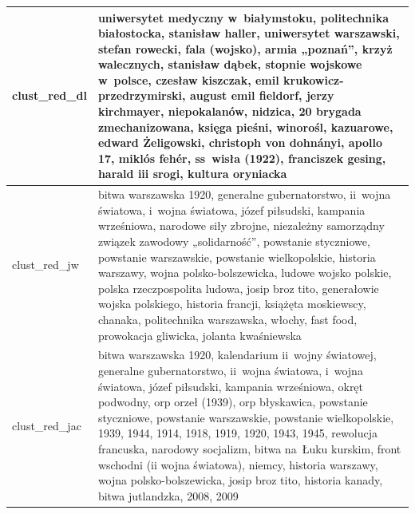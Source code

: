 \documentclass{praca1}
\begin{document}
\begin{longtable}{|L{0.5cm}|L{15cm}|}
   \hline
\begin{sideways}clust\_red\_dl\end{sideways} & uniwersytet medyczny w~białymstoku, politechnika białostocka, stanisław haller, uniwersytet warszawski, stefan rowecki, fala (wojsko), armia „poznań”, krzyż walecznych, stanisław dąbek, stopnie wojskowe w~polsce, czesław kiszczak, emil krukowicz-przedrzymirski, august emil fieldorf, jerzy kirchmayer, niepokalanów, nidzica, 20 brygada zmechanizowana, księga pieśni, winorośl, kazuarowe, edward Żeligowski, christoph von dohnányi, apollo 17, miklós fehér, ss~wisła (1922), franciszek gesing, harald iii srogi, kultura oryniacka \\ %
   \hline
\begin{sideways}clust\_red\_jw\end{sideways} & bitwa warszawska 1920, generalne gubernatorstwo, ii~wojna światowa, i~wojna światowa, józef piłsudski, kampania wrześniowa, narodowe siły zbrojne, niezależny samorządny związek zawodowy „solidarność”, powstanie styczniowe, powstanie warszawskie, powstanie wielkopolskie, historia warszawy, wojna polsko-bolszewicka, ludowe wojsko polskie, polska rzeczpospolita ludowa, josip broz tito, generałowie wojska polskiego, historia francji, książęta moskiewscy, chanaka, politechnika warszawska, włochy, fast food, prowokacja gliwicka, jolanta kwaśniewska \\ %
   \hline
\begin{sideways}clust\_red\_jac\end{sideways} & bitwa warszawska 1920, kalendarium ii~wojny światowej, generalne gubernatorstwo, ii~wojna światowa, i~wojna światowa, józef piłsudski, kampania wrześniowa, okręt podwodny, orp orzeł (1939), orp błyskawica, powstanie styczniowe, powstanie warszawskie, powstanie wielkopolskie, 1939, 1944, 1914, 1918, 1919, 1920, 1943, 1945, rewolucja francuska, narodowy socjalizm, bitwa na~Łuku kurskim, front wschodni (ii wojna światowa), niemcy, historia warszawy, wojna polsko-bolszewicka, josip broz tito, historia kanady, bitwa jutlandzka, 2008, 2009 \\ %

\end{longtable}
\end{document}
